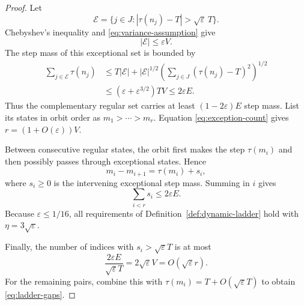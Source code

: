 \documentclass[10pt,a4paper]{amsart}
\begin{document}
\begin{proof}
Let
\[
 \mathcal E=\{j\in J:|\tau(n_j)-T|>\sqrt\varepsilon\,T\}.
\]
Chebyshev's inequality and \eqref{eq:variance-assumption} give
\begin{equation}\label{eq:exception-count}
 |\mathcal E|\leq\varepsilon V.
\end{equation}
The step mass of this exceptional set is bounded by
\begin{align*}
 \sum_{j\in\mathcal E}\tau(n_j)
 &\leq T|\mathcal E|
 +|\mathcal E|^{1/2}
   \left(\sum_{j\in J}(\tau(n_j)-T)^2\right)^{1/2}\\
 &\leq (\varepsilon+\varepsilon^{3/2})TV
 \leq2\varepsilon E.
\end{align*}
Thus the complementary regular set carries at least $(1-2\varepsilon)E$
step mass.  List its states in orbit order as $m_1>\cdots>m_r$.
Equation \eqref{eq:exception-count} gives
$r=(1+O(\varepsilon))V$.

Between consecutive regular states, the orbit first makes the step
$\tau(m_i)$ and then possibly passes through exceptional states.  Hence
\[
 m_i-m_{i+1}=\tau(m_i)+s_i,
\]
where $s_i\geq0$ is the intervening exceptional step mass.  Summing in
$i$ gives
\[
 \sum_{i<r}s_i\leq2\varepsilon E.
\]
Because $\varepsilon\leq1/16$, all requirements of
Definition~\ref{def:dynamic-ladder} hold with
$\eta=3\sqrt\varepsilon$.

Finally, the number of indices with
$s_i>\sqrt\varepsilon T$ is at most
\[
 \frac{2\varepsilon E}{\sqrt\varepsilon T}
 =2\sqrt\varepsilon V
 =O(\sqrt\varepsilon r).
\]
For the remaining pairs, combine this with
$\tau(m_i)=T+O(\sqrt\varepsilon T)$ to obtain
\eqref{eq:ladder-gaps}.
\end{proof}
\end{document}
